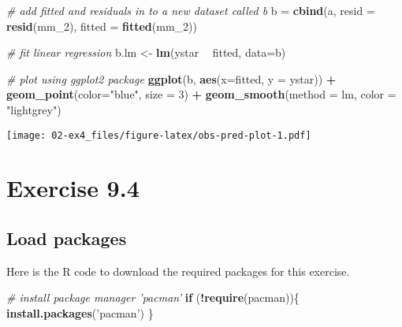 \documentclass[]{book}
\newenvironment{Shaded}{\begin{snugshade}}{\end{snugshade}}
\newcommand{\CommentTok}[1]{\textcolor[rgb]{0.56,0.35,0.01}{\textit{#1}}}
\newcommand{\ControlFlowTok}[1]{\textcolor[rgb]{0.13,0.29,0.53}{\textbf{#1}}}
\newcommand{\DataTypeTok}[1]{\textcolor[rgb]{0.13,0.29,0.53}{#1}}
\newcommand{\DecValTok}[1]{\textcolor[rgb]{0.00,0.00,0.81}{#1}}
\newcommand{\KeywordTok}[1]{\textcolor[rgb]{0.13,0.29,0.53}{\textbf{#1}}}
\newcommand{\NormalTok}[1]{#1}
\newcommand{\OperatorTok}[1]{\textcolor[rgb]{0.81,0.36,0.00}{\textbf{#1}}}
\newcommand{\StringTok}[1]{\textcolor[rgb]{0.31,0.60,0.02}{#1}}
\begin{document}
\begin{Shaded}
\begin{Highlighting}[]
\CommentTok{# add fitted and residuals in to a new dataset called b}
\NormalTok{b =}\StringTok{ }\KeywordTok{cbind}\NormalTok{(a, }\DataTypeTok{resid =} \KeywordTok{resid}\NormalTok{(mm_}\DecValTok{2}\NormalTok{), }\DataTypeTok{fitted =} \KeywordTok{fitted}\NormalTok{(mm_}\DecValTok{2}\NormalTok{))}

\CommentTok{# fit linear regression}
\NormalTok{b.lm <-}\StringTok{ }\KeywordTok{lm}\NormalTok{(ystar }\OperatorTok{~}\StringTok{ }\NormalTok{fitted, }\DataTypeTok{data=}\NormalTok{b)}

\CommentTok{# plot using ggplot2 package}
\KeywordTok{ggplot}\NormalTok{(b, }\KeywordTok{aes}\NormalTok{(}\DataTypeTok{x=}\NormalTok{fitted, }\DataTypeTok{y =}\NormalTok{ ystar)) }\OperatorTok{+}
\StringTok{  }\KeywordTok{geom_point}\NormalTok{(}\DataTypeTok{color=}\StringTok{"blue"}\NormalTok{, }\DataTypeTok{size =} \DecValTok{3}\NormalTok{) }\OperatorTok{+}
\StringTok{  }\KeywordTok{geom_smooth}\NormalTok{(}\DataTypeTok{method =}\NormalTok{ lm, }\DataTypeTok{color =} \StringTok{"lightgrey"}\NormalTok{)}
\end{Highlighting}
\end{Shaded}

\texttt{[image: 02-ex4\_files/figure-latex/obs-pred-plot-1.pdf]}

\hypertarget{ex9_4}{%
\chapter{Exercise 9.4}\label{ex9_4}}

\hypertarget{load-packages-2}{%
\section{Load packages}\label{load-packages-2}}

Here is the R code to download the required packages for this exercise.

\begin{Shaded}
\begin{Highlighting}[]
\CommentTok{# install package manager 'pacman'}
\ControlFlowTok{if}\NormalTok{ (}\OperatorTok{!}\KeywordTok{require}\NormalTok{(pacman))\{}
  \KeywordTok{install.packages}\NormalTok{(}\StringTok{'pacman'}\NormalTok{)}
\NormalTok{\}}
\end{Highlighting}
\end{Shaded}
\end{document}
